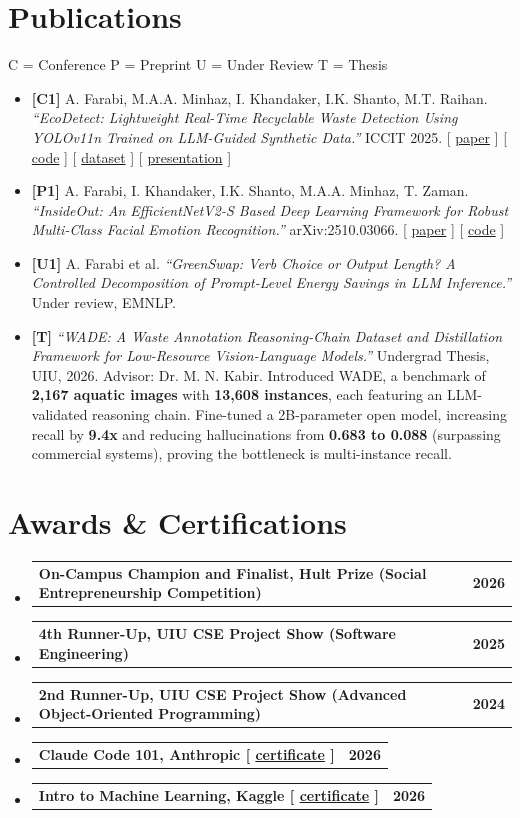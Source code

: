 \documentclass[letterpaper,9pt]{article}
\makeatletter
\newcommand{\resumeItem}[1]{
  \item\small{
    {#1 \vspace{1pt}}
  }
}
\newcommand{\resumeLineHeading}[2]{
    \item
    \begin{tabular*}{0.97\textwidth}{l@{\extracolsep{\fill}}r}
      \small\textbf{#1} & \small \textcolor{AccentColor}{\textbf{#2}} \\
    \end{tabular*}\vspace{1pt}
}
\newcommand{\resumeSubHeadingListStart}{\begin{itemize}[leftmargin=0.15in, label={}, itemsep=1pt]}
\newcommand{\resumeSubHeadingListEnd}{\end{itemize}\vspace{-10pt}}
\makeatother
\begin{document}
\section{Publications}
\small{\textcolor{AccentColor}{C} = Conference \quad \textcolor{AccentColor}{P} = Preprint \quad \textcolor{AccentColor}{U} = Under Review \quad \textcolor{AccentColor}{T} = Thesis}
\vspace{2pt}
    
\resumeSubHeadingListStart
  \resumeItem{
    \textbf{[C1]} A. Farabi, M.A.A. Minhaz, I. Khandaker, I.K. Shanto, M.T. Raihan. \textit{``EcoDetect: Lightweight Real-Time Recyclable Waste Detection Using YOLOv11n Trained on LLM-Guided Synthetic Data.''} ICCIT 2025.
    [ \href{https://ieeexplore.ieee.org/abstract/document/11491266}{paper} ]
    [ \href{https://github.com/TheAhsanFarabi/EcoDetect}{code} ]
    [ \href{https://www.kaggle.com/datasets/ahsan71/ecodetect-recyclable-waste-detection-dataset}{dataset} ]
    [ \href{https://www.youtube.com/watch?v=hPAnPDIOQHE}{presentation} ]
  }
  \resumeItem{
    \textbf{[P1]} A. Farabi, I. Khandaker, I.K. Shanto, M.A.A. Minhaz, T. Zaman. \textit{``InsideOut: An EfficientNetV2-S Based Deep Learning Framework for Robust Multi-Class Facial Emotion Recognition.''} arXiv:2510.03066.
    [ \href{https://arxiv.org/abs/2510.03066}{paper} ]
    [ \href{https://github.com/TheAhsanFarabi/InsideOut}{code} ]
  }
  \resumeItem{
    \textbf{[U1]} A. Farabi et al. \textit{``GreenSwap: Verb Choice or Output Length? A Controlled Decomposition of Prompt-Level Energy Savings in LLM Inference.''} Under review, EMNLP.
  }
  \resumeItem{
    \textbf{[T]} \textit{``WADE: A Waste Annotation Reasoning-Chain Dataset and Distillation Framework for Low-Resource Vision-Language Models.''} Undergrad Thesis, UIU, 2026. Advisor: Dr. M. N. Kabir. Introduced WADE, a benchmark of \textbf{2,167 aquatic images} with \textbf{13,608 instances}, each featuring an LLM-validated reasoning chain. Fine-tuned a 2B-parameter open model, increasing recall by \textbf{9.4x} and reducing hallucinations from \textbf{0.683 to 0.088} (surpassing commercial systems), proving the bottleneck is multi-instance recall.
  }
\resumeSubHeadingListEnd
    
\section{Awards \& Certifications}
\resumeSubHeadingListStart
  \resumeLineHeading{On-Campus Champion and Finalist, Hult Prize (Social Entrepreneurship Competition)}{2026}
  \resumeLineHeading{4th Runner-Up, UIU CSE Project Show (Software Engineering)}{2025}
  \resumeLineHeading{2nd Runner-Up, UIU CSE Project Show (Advanced Object-Oriented Programming)}{2024}
  \resumeLineHeading{Claude Code 101, Anthropic [ \href{https://verify.skilljar.com/c/w8b2ptij45ib}{certificate} ]}{2026}
  \resumeLineHeading{Intro to Machine Learning, Kaggle [ \href{https://www.kaggle.com/learn/certification/mdabdulahadminhaz/intro-to-machine-learning}{certificate} ]}{2026}
\resumeSubHeadingListEnd
\end{document}
